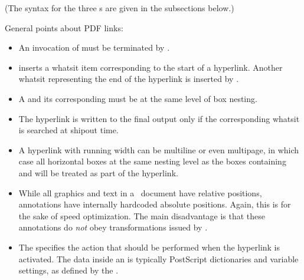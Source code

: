 \documentclass{pdftexmanual}
\begin{document}
\noindent {}

\noindent (The syntax for the three s are given
in the subsections below.)\aftersyntax

General points about PDF links:

\begin{itemize}
\item An invocation of  must be terminated by
. 

\item {} inserts a whatsit item corresponding to the start of
a hyperlink. Another whatsit representing the end of the hyperlink is
inserted by .

\item A  and its corresponding  must be
at the same level of box nesting.

\item The hyperlink is written to the final output only if the
corresponding whatsit is searched at shipout time.

\item A hyperlink with running width can be multi\hyph line or even
multi\hyph page, in which case all horizontal boxes at the same nesting
level as the boxes containing  and  will
be treated as part of the hyperlink.

\item While all graphics and text in a \PDF\ document have relative
positions, annotations have internally hard\hyph coded absolute
positions. Again, this is for the sake of speed optimization. The main
disadvantage is that these annotations do \emph{not} obey
transformations issued by \type{\pdfliteral}.

\item The  specifies the action that should be
performed when the hyperlink is activated. The data inside an
 is typically PostScript dictionaries and
variable settings, as defined by the \PDFReference.

\end{itemize}
\end{document}
